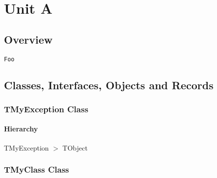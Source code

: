 \documentclass{report}
\newif\ifpdf
\begin{document}
\label{toc}\tableofcontents
\newpage
\newlength{\tmplength}
\chapter{Unit A}
\label{A}
\section{Overview}
\begin{description}
\item[\texttt{\begin{ttfamily}TMyException\end{ttfamily} Class}]
\item[\texttt{\begin{ttfamily}TMyClass\end{ttfamily} Class}]
\end{description}
\begin{description}
\item[\texttt{Foo}]
\end{description}
\section{Classes, Interfaces, Objects and Records}
\ifpdf
\subsection*{\large{\textbf{TMyException Class}}\normalsize\hspace{1ex}\hrulefill}
\else
\subsection*{TMyException Class}
\fi
\label{A.TMyException}
\subsubsection*{\large{\textbf{Hierarchy}}\normalsize\hspace{1ex}\hfill}
TMyException {$>$} TObject
\ifpdf
\subsection*{\large{\textbf{TMyClass Class}}\normalsize\hspace{1ex}\hrulefill}
\else
\subsection*{TMyClass Class}
\fi
\label{A.TMyClass}
\end{document}

